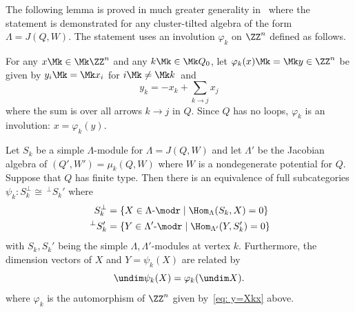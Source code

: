 

The following lemma is proved in much greater generality in~\cite[Sec~7]{BIRSm} where the statement is demonstrated for any cluster-tilted algebra of the form $\Lambda=J(Q,W)$. The statement uses an involution $\varphi_k$ on $\ZZ^n$ defined as follows.

For any $x \Mk \in \Mk \ZZ^n$ and any $k\Mk \in \Mk Q_0$, let $\varphi_k(x)\Mk =\Mk y\in \ZZ^n$ be given by $y_i\Mk =\Mk x_i$ for $i\Mk \neq \Mk k$~and
\begin{equation}\label{eq: y=Xkx}
	y_k=-x_k+\sum_{k\to j} x_j
\end{equation}
where the sum is over all arrows $k\to j$ in $Q$.
Since $Q$ has no loops, $\varphi_k$ is an involution: $x=\varphi_k(y)$.


\begin{lemm}\label{lem: inductive step A=B for Q finite type}
Let $S_k$ be a simple $\Lambda$-module for $\Lambda=J(Q,W)$ and let $\Lambda'$ be the Jacobian algebra of $(Q',W')=\mu_k(Q,W)$ where $W$ is a nondegenerate potential for $Q$. Suppose that $Q$ has finite type. Then there is an equivalence of full subcategories $\psi_k:S_k^\perp\cong \,^{\perp}S_k'$ where
\[
\begin{aligned}
	S_k^\perp&=\{X\in \Lambda\text{-}\modr \mid %
	\Hom_\Lambda(S_k,X)=0\}
\\
	\,^{\perp}S_k'&=\{Y\in \Lambda'\text{-}\modr\mid \Hom_{\Lambda'}(Y,S_k')=0\}
\end{aligned}
\]
with $S_k,S_k'$ being the simple $\Lambda,\Lambda'$-modules at vertex $k$. Furthermore, the dimension vectors of $X$ and $Y=\psi_k(X)$ are related by
\[
	\undim \psi_k(X)=\varphi_k(\undim X).
\]
where $\varphi_k$ is the automorphism of $\ZZ^n$ given by~\eqref{eq: y=Xkx} above.
\end{lemm}


